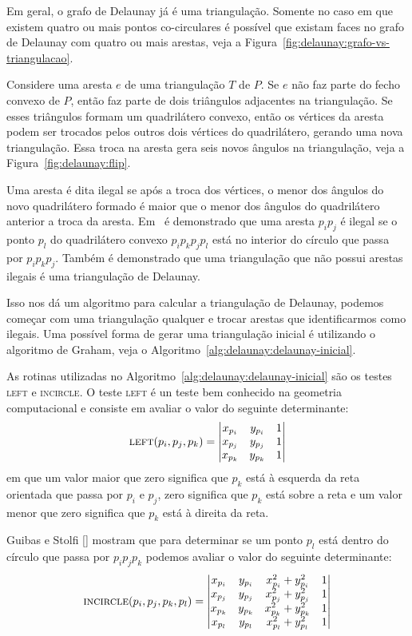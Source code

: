 Em geral, o grafo de Delaunay já é uma triangulação.
Somente no caso em que existem quatro ou mais pontos co-circulares é possível que existam faces no
grafo de Delaunay com quatro ou mais arestas, veja a
Figura~\ref{fig:delaunay:grafo-vs-triangulacao}.

Considere uma aresta $e$ de uma triangulação $T$ de $P$.
Se $e$ não faz parte do fecho convexo de $P$, então faz parte de dois triângulos adjacentes na
triangulação.
Se esses triângulos formam um quadrilátero convexo, então os vértices da aresta podem ser trocados
pelos outros dois vértices do quadrilátero, gerando uma nova triangulação.
Essa troca na aresta gera seis novos ângulos na triangulação, veja a
Figura~\ref{fig:delaunay:flip}.

Uma aresta é dita ilegal se após a troca dos vértices, o menor dos ângulos do novo quadrilátero
formado é maior que o menor dos ângulos do quadrilátero anterior a troca da aresta.
Em~\cite{computationalgeometry} é demonstrado que uma aresta $p_{i}p_{j}$ é ilegal se o ponto
$p_{l}$ do quadrilátero convexo $p_{i}p_{k}p_{j}p_{l}$ está no interior do círculo que passa por
$p_{i}p_{k}p_{j}$.
Também é demonstrado que uma triangulação que não possui arestas ilegais é uma triangulação de
Delaunay.

Isso nos dá um algoritmo para calcular a triangulação de Delaunay, podemos começar com uma
triangulação qualquer e trocar arestas que identificarmos como ilegais.
Uma possível forma de gerar uma triangulação inicial é utilizando o algoritmo de Graham, veja o
Algoritmo~\ref{alg:delaunay:delaunay-inicial}.

As rotinas utilizadas no Algoritmo~\ref{alg:delaunay:delaunay-inicial} são os testes \textsc{left}
e \textsc{incircle}.
O teste \textsc{left} é un teste bem conhecido na geometria computacional e consiste em avaliar o
valor do seguinte determinante:
$$\textsc{left}(p_i, p_j, p_k) =
\begin{vmatrix}
    x_{p_i} & y_{p_i} & 1 \\
    x_{p_j} & y_{p_j} & 1 \\
    x_{p_k} & y_{p_k} & 1
\end{vmatrix}$$
em que um valor maior que zero significa que $p_k$ está à esquerda da reta orientada que passa por
$p_i$ e $p_j$, zero significa que $p_k$ está sobre a reta e um valor menor que zero significa que
$p_k$ está à direita da reta.

Guibas e Stolfi [\cite{guibas-stolfi}] mostram que para determinar se um ponto $p_l$ está dentro
do círculo que passa por $p_{i}p_{j}p_{k}$ podemos avaliar o valor do seguinte determinante:
$$\textsc{incircle}(p_i, p_j, p_k, p_l) =
\begin{vmatrix}
    x_{p_i} & y_{p_i} & x_{p_i}^2 + y_{p_i}^2 & 1 \\
    x_{p_j} & y_{p_j} & x_{p_j}^2 + y_{p_j}^2 & 1 \\
    x_{p_k} & y_{p_k} & x_{p_k}^2 + y_{p_k}^2 & 1 \\
    x_{p_l} & y_{p_l} & x_{p_l}^2 + y_{p_l}^2 & 1
\end{vmatrix}$$

